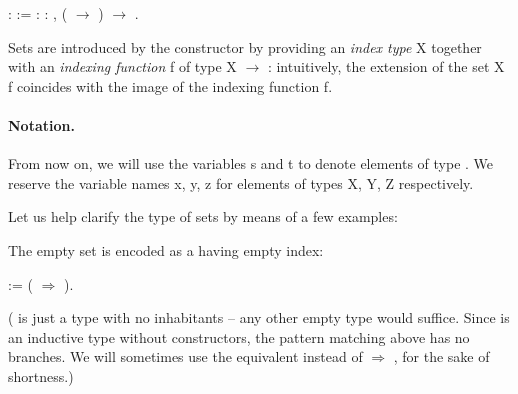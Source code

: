 \begin{coqdoccode}
\coqdocnoindent
{}  :  :=\coqdoceol
\coqdocindent{2.00em}
 : \coqdockw{\ensuremath{\forall}}  : , ( \ensuremath{\rightarrow} ) \ensuremath{\rightarrow} .\coqdoceol
\coqdocemptyline
\end{coqdoccode}

Sets are introduced by the  constructor by providing an \emph{index type} \var X together with an \emph{indexing function} \var f of type \var X $\to$ : intuitively, the extension of the set  \var X \var f coincides with the image of the indexing function \var f.



\noindent\paragraph{Notation.} From now on, we will use the variables \var s and \var t to denote elements of type . We reserve the variable names \var x, \var y, \var z for elements of types \var X, \var Y, \var Z respectively.

\medskip

Let us help clarify the type of sets by means of a few examples:

\begin{example}
  The empty set is encoded as a  having empty index:

  \begin{coqdoccode}
    \coqdocnoindent
      :=   (  \ensuremath{\Rightarrow}    ).\coqdoceol
    \coqdocemptyline
  \end{coqdoccode}
  ( is just a type with no inhabitants -- any other empty type would suffice. Since  is an inductive type without constructors, the pattern matching above has no branches. We will sometimes use the equivalent  \coqdocvar{\_} instead of   \ensuremath{\Rightarrow}    , for the sake of shortness.)
\end{example}

